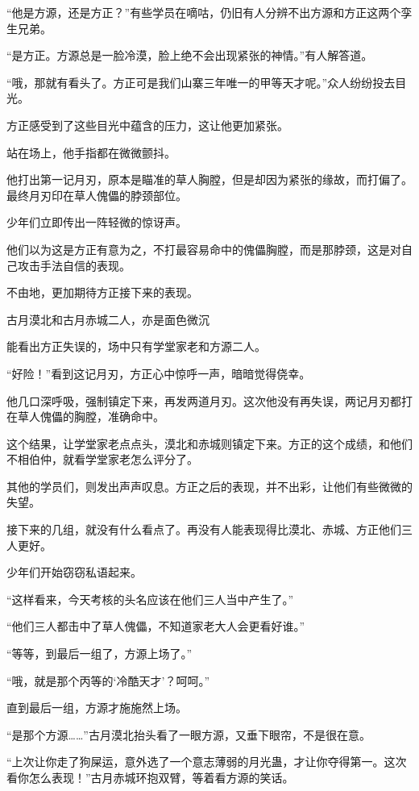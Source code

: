 
\begin{this_body}

“他是方源，还是方正？”有些学员在嘀咕，仍旧有人分辨不出方源和方正这两个孪生兄弟。

“是方正。方源总是一脸冷漠，脸上绝不会出现紧张的神情。”有人解答道。

“哦，那就有看头了。方正可是我们山寨三年唯一的甲等天才呢。”众人纷纷投去目光。

方正感受到了这些目光中蕴含的压力，这让他更加紧张。

站在场上，他手指都在微微颤抖。

他打出第一记月刃，原本是瞄准的草人胸膛，但是却因为紧张的缘故，而打偏了。最终月刃印在草人傀儡的脖颈部位。

少年们立即传出一阵轻微的惊讶声。

他们以为这是方正有意为之，不打最容易命中的傀儡胸膛，而是那脖颈，这是对自己攻击手法自信的表现。

不由地，更加期待方正接下来的表现。

古月漠北和古月赤城二人，亦是面色微沉

能看出方正失误的，场中只有学堂家老和方源二人。

“好险！”看到这记月刃，方正心中惊呼一声，暗暗觉得侥幸。

他几口深呼吸，强制镇定下来，再发两道月刃。这次他没有再失误，两记月刃都打在草人傀儡的胸膛，准确命中。

这个结果，让学堂家老点点头，漠北和赤城则镇定下来。方正的这个成绩，和他们不相伯仲，就看学堂家老怎么评分了。

其他的学员们，则发出声声叹息。方正之后的表现，并不出彩，让他们有些微微的失望。

接下来的几组，就没有什么看点了。再没有人能表现得比漠北、赤城、方正他们三人更好。

少年们开始窃窃私语起来。

“这样看来，今天考核的头名应该在他们三人当中产生了。”

“他们三人都击中了草人傀儡，不知道家老大人会更看好谁。”

“等等，到最后一组了，方源上场了。”

“哦，就是那个丙等的‘冷酷天才’？呵呵。”

直到最后一组，方源才施施然上场。

“是那个方源……”古月漠北抬头看了一眼方源，又垂下眼帘，不是很在意。

“上次让你走了狗屎运，意外选了一个意志薄弱的月光蛊，才让你夺得第一。这次看你怎么表现！”古月赤城环抱双臂，等着看方源的笑话。


\end{this_body}
